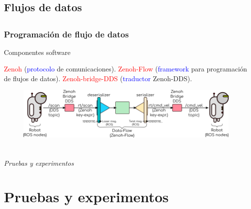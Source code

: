 \documentclass{beamer}
\begin{document}
\subsection{Flujos de datos}



\subsection*{}
\begin{frame}
\frametitle{Programación de flujo de datos}
\begin{block}{Componentes software}
\begin{outline}
\1 \textcolor{red}{Zenoh}            (\textcolor{blue}{protocolo} de comunicaciones).
\1 \textcolor{red}{Zenoh-Flow}       (\textcolor{blue}{framework} para programación de flujos de datos).
\1 \textcolor{red}{Zenoh-bridge-DDS} (\textcolor{blue}{traductor} Zenoh-DDS).
\end{outline}
\end{block}
\begin{figure}
\centering
\includegraphics[width=12.0cm]{figs/zenoh_dds_topology.png}
\end{figure}
\end{frame}





\section*{}
\begin{frame}{}
  \centering \Huge
  \emph{Pruebas y experimentos}
\end{frame}

\section{Pruebas y experimentos}
\end{document}
